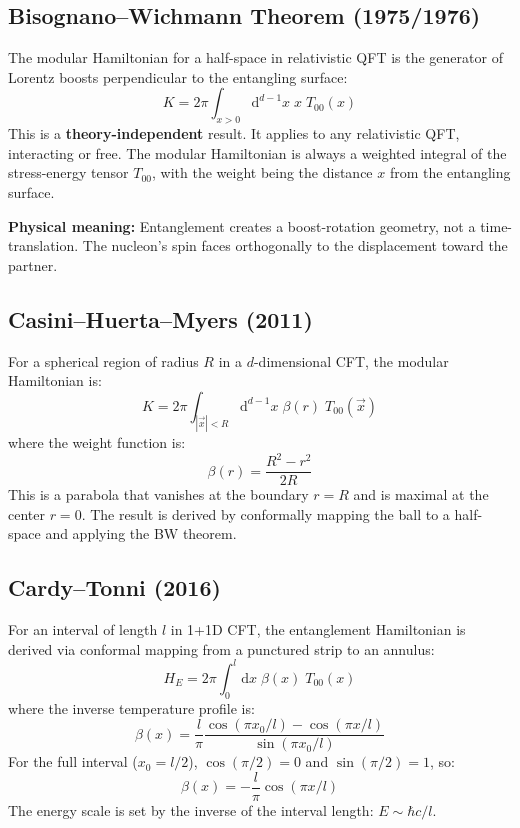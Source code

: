 \documentclass[11pt,letterpaper]{article}
\begin{document}
\subsection{Bisognano--Wichmann Theorem (1975/1976)}

The modular Hamiltonian for a half-space in relativistic QFT is the generator
of Lorentz boosts perpendicular to the entangling surface:
\begin{equation}
  K = 2\pi \int_{x>0} \mathrm{d}^{d-1}x \; x \; T_{00}(x)
  \label{eq:bw}
\end{equation}
This is a \textbf{theory-independent} result. It applies to any relativistic QFT,
interacting or free. The modular Hamiltonian is always a weighted integral of
the stress-energy tensor $T_{00}$, with the weight being the distance $x$ from
the entangling surface.

\textbf{Physical meaning:} Entanglement creates a boost-rotation geometry, not a
time-translation. The nucleon's spin faces orthogonally to the displacement
toward the partner.

\subsection{Casini--Huerta--Myers (2011)}

For a spherical region of radius $R$ in a $d$-dimensional CFT, the modular
Hamiltonian is:
\begin{equation}
  K = 2\pi \int_{|\vec{x}|<R} \mathrm{d}^{d-1}x \; \beta(r) \; T_{00}(\vec{x})
  \label{eq:chm}
\end{equation}
where the weight function is:
\begin{equation}
  \beta(r) = \frac{R^2 - r^2}{2R}
  \label{eq:chm_weight}
\end{equation}
This is a parabola that vanishes at the boundary $r = R$ and is maximal at
the center $r = 0$. The result is derived by conformally mapping the ball to
a half-space and applying the BW theorem.

\subsection{Cardy--Tonni (2016)}

For an interval of length $l$ in 1+1D CFT, the entanglement Hamiltonian is
derived via conformal mapping from a punctured strip to an annulus:
\begin{equation}
  H_E = 2\pi \int_0^l \mathrm{d}x \; \beta(x) \; T_{00}(x)
  \label{eq:cardy_tonni}
\end{equation}
where the inverse temperature profile is:
\begin{equation}
  \beta(x) = \frac{l}{\pi}
  \frac{\cos(\pi x_0/l) - \cos(\pi x/l)}{\sin(\pi x_0/l)}
  \label{eq:cardy_tonni_beta}
\end{equation}
For the full interval ($x_0 = l/2$), $\cos(\pi/2) = 0$ and $\sin(\pi/2) = 1$, so:
\begin{equation}
  \beta(x) = -\frac{l}{\pi} \cos(\pi x/l)
  \label{eq:cardy_tonni_full}
\end{equation}
The energy scale is set by the inverse of the interval length: $E \sim \hbar c/l$.
\end{document}
